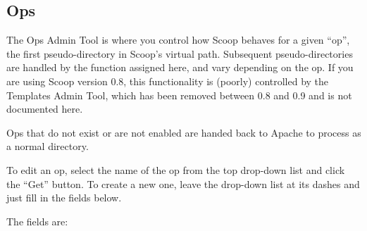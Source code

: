 \subsection{Ops}
\label{admin-tools-ops}

The Ops Admin Tool is where you control how Scoop behaves for a given ``op'', the first pseudo-directory in Scoop's virtual path.  Subsequent pseudo-directories are handled by the function assigned here, and vary depending on the op.  If you are using Scoop version 0.8, this functionality is (poorly) controlled by the Templates Admin Tool, which has been removed between 0.8 and 0.9 and is not documented here.

Ops that do not exist or are not enabled are handed back to Apache to process as a normal directory.

To edit an op, select the name of the op from the top drop-down list and click the ``Get'' button.  To create a new one, leave the drop-down list at its dashes and just fill in the fields below.

The fields are:

